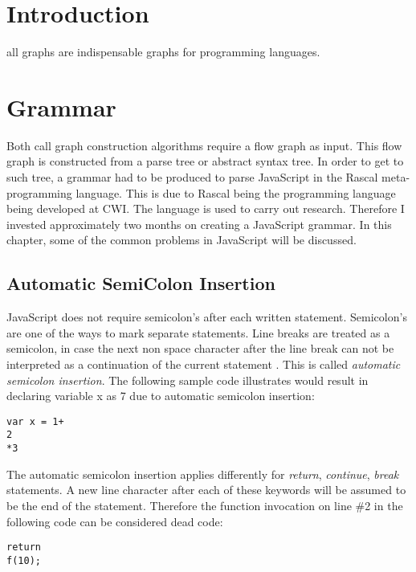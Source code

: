 \documentclass[journal,10pt]{IEEEtran} %
\begin{document}
\section{Introduction}
all graphs are indispensable graphs for programming languages.
\section{Grammar}
Both call graph construction algorithms require a flow graph as input. This flow graph is constructed from a parse tree or abstract syntax tree. In order to get to such tree, a grammar had to be produced to parse JavaScript in the Rascal meta-programming language. This is due to Rascal being the programming language being developed at CWI. The language is used to carry out research. Therefore I invested approximately two months on creating a JavaScript grammar. In this chapter, some of the common problems in JavaScript will be discussed.
\subsection{Automatic SemiColon Insertion}
JavaScript does not require semicolon's after each written statement. Semicolon's are one of the ways to mark separate statements. Line breaks are treated as a semicolon, in case the next non space character after the line break can not be interpreted as a continuation of the current statement \cite[p. 25]{flanagan2011javascript}. This is called \textit{automatic semicolon insertion}. The following sample code illustrates would result in declaring variable x as 7 due to automatic semicolon insertion:
\vskip 6pt
\begin{verbatim}
var x = 1+
2
*3
\end{verbatim}
\vskip 6pt
The automatic semicolon insertion applies differently for \textit{return}, \textit{continue}, \textit{break} statements. A new line character after each of these keywords will be assumed to be the end of the statement. Therefore the function invocation on line \#2 in the following code can be considered dead code:
\vskip 6pt
\begin{verbatim}
return
f(10);
\end{verbatim}
\end{document}
